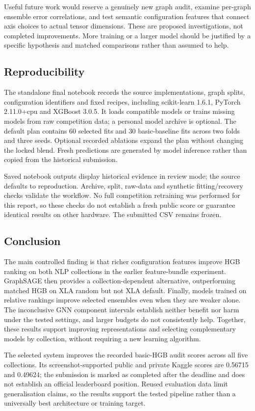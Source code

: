 \documentclass[letterpaper]{article}
\begin{document}
Useful future work would reserve a genuinely new graph audit, examine per-graph ensemble error correlations, and test semantic configuration features that connect axis choices to actual tensor dimensions. These are proposed investigations, not completed improvements. More training or a larger model should be justified by a specific hypothesis and matched comparisons rather than assumed to help.

\subsection{Reproducibility}
The standalone final notebook records the source implementations, graph splits, configuration identifiers and fixed recipes, including scikit-learn 1.6.1, PyTorch 2.11.0+cpu and XGBoost 3.0.5. It loads compatible models or trains missing models from raw competition data; a personal model archive is optional. The default plan contains 60 selected fits and 30 basic-baseline fits across two folds and three seeds. Optional recorded ablations expand the plan without changing the locked blend. Fresh predictions are generated by model inference rather than copied from the historical submission.

Saved notebook outputs display historical evidence in review mode; the source defaults to reproduction. Archive, split, raw-data and synthetic fitting/recovery checks validate the workflow. No full competition retraining was performed for this report, so these checks do not establish a fresh public score or guarantee identical results on other hardware. The submitted CSV remains frozen.

\subsection{Conclusion}
The main controlled finding is that richer configuration features improve HGB ranking on both NLP collections in the earlier feature-bundle experiment. GraphSAGE then provides a collection-dependent alternative, outperforming matched HGB on XLA random but not XLA default. Finally, models trained on relative rankings improve selected ensembles even when they are weaker alone. The inconclusive GNN component intervals establish neither benefit nor harm under the tested settings, and larger budgets do not consistently help. Together, these results support improving representations and selecting complementary models by collection, without requiring a new learning algorithm.

The selected system improves the recorded basic-HGB audit scores across all five collections. Its screenshot-supported public and private Kaggle scores are 0.56715 and 0.49624; the submission is marked as completed after the deadline and does not establish an official leaderboard position. Reused evaluation data limit generalisation claims, so the results support the tested pipeline rather than a universally best architecture or training target.
\end{document}
